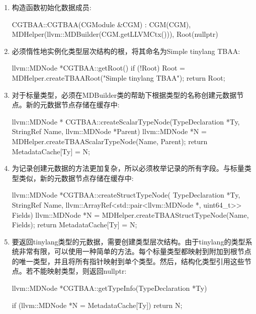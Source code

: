\begin{enumerate}
\item
构造函数初始化数据成员:

\begin{cpp}
CGTBAA::CGTBAA(CGModule &CGM)
    : CGM(CGM),
    MDHelper(llvm::MDBuilder(CGM.getLLVMCtx())),
    Root(nullptr) {}
\end{cpp}

\item
必须惰性地实例化类型层次结构的根，将其命名为Simple tinylang TBAA:

\begin{cpp}
llvm::MDNode *CGTBAA::getRoot() {
    if (!Root)
        Root = MDHelper.createTBAARoot("Simple tinylang TBAA");
    return Root;
}
\end{cpp}

\item
对于标量类型，必须在MDBuilder类的帮助下根据类型的名称创建元数据节点。新的元数据节点存储在缓存中:

\begin{cpp}
llvm::MDNode *
CGTBAA::createScalarTypeNode(TypeDeclaration *Ty,
                            StringRef Name,
                            llvm::MDNode *Parent) {
    llvm::MDNode *N =
        MDHelper.createTBAAScalarTypeNode(Name, Parent);
    return MetadataCache[Ty] = N;
}
\end{cpp}

\item
为记录创建元数据的方法更加复杂，所以必须枚举记录的所有字段。与标量类型类似，新的元数据节点存储在缓存中:

\begin{cpp}
llvm::MDNode *CGTBAA::createStructTypeNode(
        TypeDeclaration *Ty, StringRef Name,
        llvm::ArrayRef<std::pair<llvm::MDNode *, uint64_t>> Fields) {
    llvm::MDNode *N =
        MDHelper.createTBAAStructTypeNode(Name, Fields);
    return MetadataCache[Ty] = N;
}
\end{cpp}

\item
要返回tinylang类型的元数据，需要创建类型层次结构。由于tinylang的类型系统非常有限，可以使用一种简单的方法。每个标量类型都映射到附加到根节点的唯一类型，并且将所有指针映射到单个类型。然后，结构化类型引用这些节点。若不能映射类型，则返回nullptr:

\begin{cpp}
llvm::MDNode *CGTBAA::getTypeInfo(TypeDeclaration *Ty) {
    if (llvm::MDNode *N = MetadataCache[Ty])
        return N;

}
\end{cpp}
\end{enumerate}
